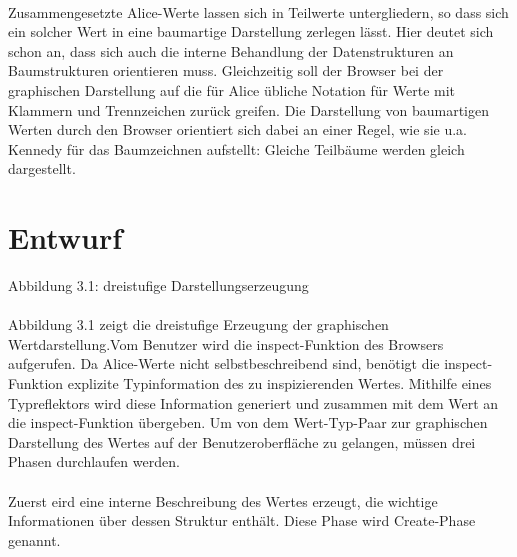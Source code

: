 \documentclass[12pt,a4paper]{article}
\begin{document}
\paragraph{}

Zusammengesetzte Alice-Werte lassen sich in Teilwerte untergliedern, 
so dass sich ein solcher Wert 
in eine baumartige Darstellung zerlegen l\"asst.
Hier deutet sich schon an, 
dass sich auch die interne Behandlung der Datenstrukturen 
an Baumstrukturen orientieren muss. Gleichzeitig soll der Browser 
bei der graphischen Darstellung auf 
die f\"ur Alice \"ubliche Notation f\"ur 
Werte mit Klammern und Trennzeichen 
zur\"uck greifen.    
Die Darstellung von baumartigen Werten durch 
den Browser orientiert sich dabei 
an einer Regel, wie sie u.a. Kennedy \cite{ke:dr} f\"ur 
das Baumzeichnen aufstellt: Gleiche Teilb\"aume werden 
gleich dargestellt. 



\section{Entwurf}

\begin{center}
Abbildung 3.1: dreistufige Darstellungserzeugung
\end{center}

\paragraph{}

Abbildung 3.1 zeigt die dreistufige Erzeugung der graphischen
Wertdarstellung.Vom Benutzer wird die inspect-Funktion des 
Browsers aufgerufen.
Da Alice-Werte nicht selbstbeschreibend sind, ben\"otigt die
inspect-Funktion explizite Typinformation des zu inspizierenden
Wertes. Mithilfe eines Typreflektors wird diese Information
generiert und zusammen mit dem Wert an die inspect-Funktion
\"ubergeben. Um von dem Wert-Typ-Paar zur graphischen 
Darstellung des Wertes auf der Benutzeroberfl\"ache zu gelangen,
m\"ussen drei Phasen durchlaufen werden.

\paragraph{}

Zuerst eird eine interne Beschreibung des Wertes erzeugt, die
wichtige Informationen \"uber dessen Struktur enth\"alt. Diese
Phase wird Create-Phase genannt.
\end{document}
